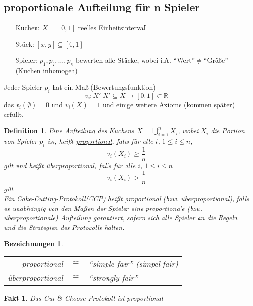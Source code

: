 \documentclass[a4paper,10pt]{scrartcl}
\newtheorem*{definition}{Definition}
\newtheorem*{bezeichnungen}{Bezeichnungen}
\newtheorem*{fakt}{Fakt}
\begin{document}
\subsection{proportionale Aufteilung für n Spieler}
 \begin{itemize}
  \item[Kuchen:] $X=[0,1]$ reelles Einheitsintervall
  \item[Stück:] $[x,y]\subseteq[0,1]$
  \item[Spieler:] $p_1,p_2,\ldots,p_n$ bewerten alle Stücke, wobei i.A. ``Wert''$\neq$``Größe'' (Kuchen inhomogen)
 \end{itemize}
 Jeder Spieler $p_i$ hat ein Maß (Bewertungsfunktion)
 \begin{displaymath}
  v_i:{X'|X'\subseteq X}\rightarrow[0,1]\subset\mathbb{R}
 \end{displaymath}
 das $v_i(\emptyset)=0$ und $v_i(X)=1$ und einige weitere Axiome (kommen später) erfüllt.
 \begin{definition}
  Eine Aufteilung des Kuchens $X=\bigcup\limits_{i=1}^{n}X_i$, wobei $X_i$ die Portion von Spieler $p_i$ ist, heißt
  \underline{proportional}, falls für alle $i$, $1\leq i\leq n$,
  \begin{displaymath}
   v_i(X_i)\geq\frac{1}{n}
  \end{displaymath}
  gilt und heißt \underline{überproportional}, falls für alle $i$, $1\leq i\leq n$
  \begin{displaymath}
   v_i(X_i)>\frac{1}{n}
  \end{displaymath}
  gilt.\\
  Ein Cake-Cutting-Protokoll(CCP) heißt \underline{proportional} (bzw. \underline{überproportional}), falls es unabhängig
  von den Maßen der Spieler eine proportionale (bzw. überproportionale) Aufteilung garantiert, sofern sich alle Spieler an die
  Regeln und die Strategien des Protokolls halten.
 \end{definition}
 \begin{bezeichnungen}
  \begin{tabular}{rcl}
   proportional &$\hat{=}$& ``simple fair'' (simpel fair)\\
   überproportional &$\hat{=}$& ``strongly fair''
  \end{tabular}
 \end{bezeichnungen}
 \begin{fakt}
  Das Cut \& Choose Protokoll ist proportional
 \end{fakt}

\end{document}

